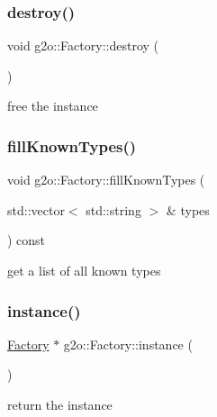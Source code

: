 \subsubsection{\texorpdfstring{destroy()}{destroy()}}
{\footnotesize\ttfamily void g2o\+::\+Factory\+::destroy (\begin{DoxyParamCaption}{ }\end{DoxyParamCaption})\hspace{0.3cm}{\ttfamily [static]}}



free the instance 

\mbox{\label{classg2o_1_1_factory_af31924e76d04bcfd77a53cec8f1b778c}} 
\subsubsection{\texorpdfstring{fill\+Known\+Types()}{fillKnownTypes()}}
{\footnotesize\ttfamily void g2o\+::\+Factory\+::fill\+Known\+Types (\begin{DoxyParamCaption}\item[{std\+::vector$<$ std\+::string $>$ \&}]{types }\end{DoxyParamCaption}) const}

get a list of all known types \mbox{\label{classg2o_1_1_factory_a8a1f33e017c5ad59399cef48972578ae}} 
\subsubsection{\texorpdfstring{instance()}{instance()}}
{\footnotesize\ttfamily \mbox{\hyperlink{classg2o_1_1_factory}{Factory}} $\ast$ g2o\+::\+Factory\+::instance (\begin{DoxyParamCaption}{ }\end{DoxyParamCaption})\hspace{0.3cm}{\ttfamily [static]}}



return the instance 

\mbox{\label{classg2o_1_1_factory_a20292a9c8417303fec92057826ba2430}} 
